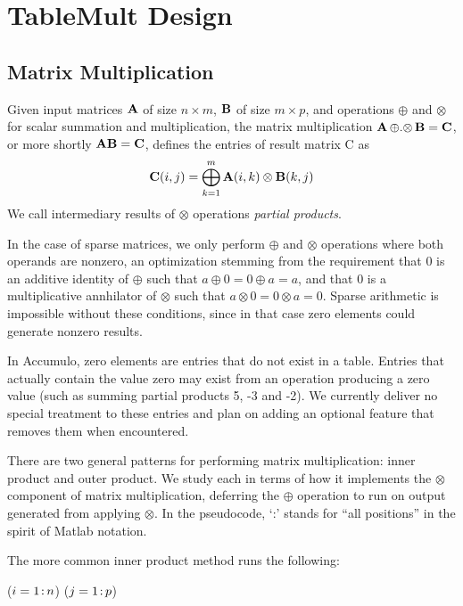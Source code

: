 
\section{TableMult Design}
\label{sDesign}


\subsection{Matrix Multiplication}
\label{sMatMul}
Given input matrices $\mathbf{A}$ of size $n \times m$, $\mathbf{B}$ of size $m \times p$,
and operations $\oplus$ and $\otimes$ for scalar summation and multiplication,
the matrix multiplication $\mathbf{A} \,{\oplus}.{\otimes}\, \mathbf{B} = \mathbf{C}$, or more shortly $\mathbf{A}\mathbf{B} = \mathbf{C}$,
defines the entries of result matrix C as 
\[ \mathbf{C}(i,j) = \bigoplus_{k=1}^m \mathbf{A}(i,k) \otimes \mathbf{B}(k,j) \]
We call intermediary results of $\otimes$ operations \emph{partial products}.

In the case of sparse matrices, we only perform $\oplus$ and $\otimes$ operations where both operands are nonzero,
an optimization stemming from the requirement that 0 is an additive identity of $\oplus$ such that $a \oplus 0 = 0 \oplus a = a$,
and that 0 is a multiplicative annhilator of $\otimes$ such that $a \otimes 0 = 0 \otimes a = 0$.
Sparse arithmetic is impossible without these conditions, since in that case zero elements could generate nonzero results.

In Accumulo, zero elements are entries that do not exist in a table. Entries that actually contain the value zero may exist
from an operation producing a zero value (such as summing partial products 5, -3 and -2).  
We currently deliver no special treatment to these entries and plan on adding
an optional feature that removes them when encountered.

There are two general patterns for performing matrix multiplication: inner product and outer product.
We study each in terms of how it implements the $\otimes$ component of matrix multiplication,
deferring the $\oplus$ operation to run on output generated from applying $\otimes$.
In the pseudocode, `:' stands for ``all positions'' in the spirit of Matlab notation.

The more common inner product method runs the following:
\begin{algorithm}[h]
\fore($i = 1\colon\! n$){
\fore($j = 1\colon\! p$){
}}
\end{algorithm}

